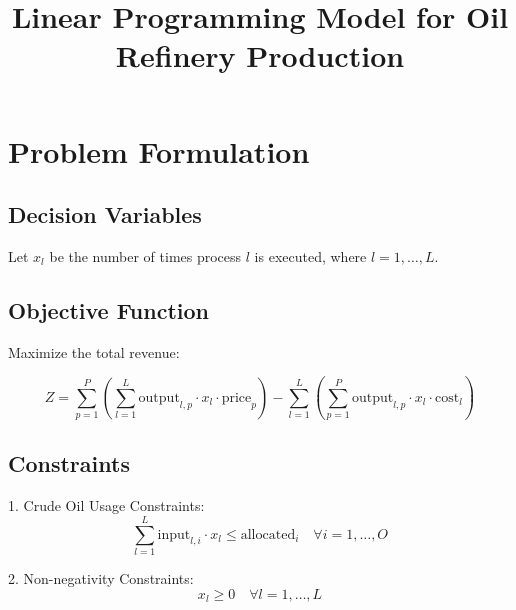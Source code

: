 \documentclass{article}
\begin{document}
\title{Linear Programming Model for Oil Refinery Production}
\author{}
\date{}
\maketitle

\section*{Problem Formulation}

\subsection*{Decision Variables}
Let \( x_l \) be the number of times process \( l \) is executed, where \( l = 1, \ldots, L \).

\subsection*{Objective Function}
Maximize the total revenue:

\[
Z = \sum_{p=1}^{P} \left( \sum_{l=1}^{L} \text{output}_{l,p} \cdot x_l \cdot \text{price}_p \right) - \sum_{l=1}^{L} \left( \sum_{p=1}^{P} \text{output}_{l,p} \cdot x_l \cdot \text{cost}_l \right)
\]

\subsection*{Constraints}

1. Crude Oil Usage Constraints:
   \[
   \sum_{l=1}^{L} \text{input}_{l,i} \cdot x_l \leq \text{allocated}_i \quad \forall i = 1, \ldots, O
   \]

2. Non-negativity Constraints:
   \[
   x_l \geq 0 \quad \forall l = 1, \ldots, L
   \]
\end{document}
